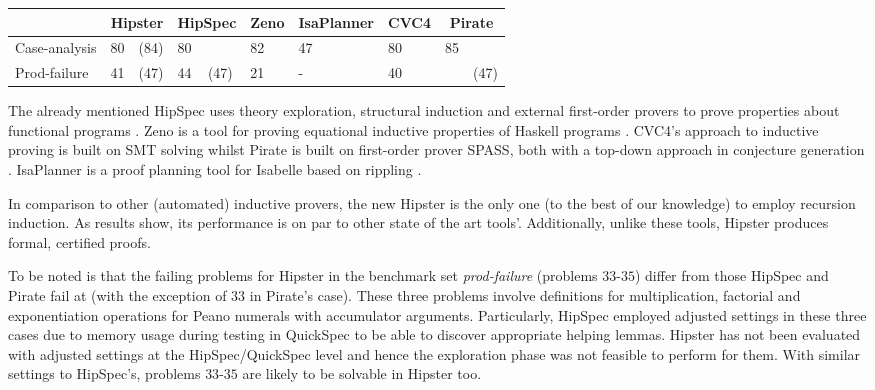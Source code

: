 \vspace{1
 mm}

\noindent \begin{tabularx}{\textwidth}{l | X X | X X | X | X | X | X X}
  & \multicolumn{2}{|c|}{Hipster}
  	& \multicolumn{2}{c|}{HipSpec}
  	& \multicolumn{1}{c|}{Zeno}
  	& \multicolumn{1}{c|}{IsaPlanner}
  	& \multicolumn{1}{c|}{CVC4}
  	& \multicolumn{2}{c}{Pirate} \\
  \hline
  Case-analysis & 80 & (84) & 80 & & 82 & 47 & 80 & 85 & \\
  Prod-failure & 41 & (47) & 44 & (47) & 21 & - & 40 & & (47) \\
\end{tabularx}

\vspace{1 mm}

\noindent The already mentioned HipSpec uses theory exploration, structural induction and external first-order provers to prove properties about functional programs \cite{hipspecCADE}.
%
Zeno is a tool for proving equational inductive properties of Haskell programs \cite{zeno}.
%
CVC4's approach to inductive proving is built on SMT solving whilst Pirate is built on first-order prover SPASS, both with a top-down approach in conjecture generation \cite{cvc4, SPASSInduction}.
%
IsaPlanner is a proof planning tool for Isabelle based on rippling \cite{isaplanner2, IsaPcase}.

In comparison to other (automated) inductive provers, the new Hipster is the only one (to the best of our knowledge) to employ recursion induction.
%
As results show, its performance is on par to other state of the art tools'.
%
Additionally, unlike these tools, Hipster produces formal, certified proofs.

To be noted is that the failing problems for Hipster in the benchmark set \emph{prod-failure} (problems $33$-$35$) differ from those HipSpec and Pirate fail at (with the exception of $33$ in Pirate's case).
%
These three problems involve definitions for multiplication, factorial and exponentiation operations for Peano numerals with accumulator arguments.
%
Particularly, HipSpec employed adjusted settings in these three cases due to memory usage during testing in QuickSpec to be able to discover appropriate helping lemmas.
%
Hipster has not been evaluated with adjusted settings at the HipSpec/QuickSpec level and hence the exploration phase was not feasible to perform for them.
%
With similar settings to HipSpec's, problems $33$-$35$ are likely to be solvable in Hipster too.


